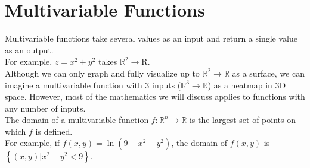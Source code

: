 \section{Multivariable Functions}
\noindent
Multivariable functions take several values as an input and return a single value as an output.\\
For example, $z=x^2+y^2$ takes $\mathbb{R}^2\to\mathrm{R}$.\\
Although we can only graph and fully visualize up to $\mathbb{R}^2\to\mathbb{R}$ as a surface, we can imagine a multivariable function with 3 inputs ($\mathbb{R}^3\to\mathbb{R}$) as a heatmap in 3D space. However, most of the mathematics we will discuss applies to functions with any number of inputs.\\

\noindent
The domain of a multivariable function $f:\mathbb{R}^n\to\mathbb{R}$ is the largest set of points on which $f$ is defined.\\
For example, if $f(x,y)=\ln{\left(9-x^2-y^2\right)}$, the domain of $f(x,y)$ is $\left\{(x,y)|x^2+y^2<9\right\}$.